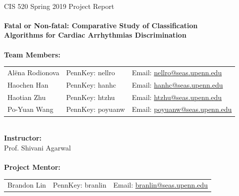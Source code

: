 \renewcommand{\headrulewidth}{0pt}
\renewcommand{\headrulewidth}{0pt}

\thispagestyle{fancy}
\mbox{}\vspace{1cm}\\
CIS 520 Spring 2019 Project Report\\
\\
{\Large \textbf{
Fatal or Non-fatal: Comparative Study of 
Classification \\Algorithms for Cardiac Arrhythmias Discrimination}} 
\\
\vspace{5cm}\\
%
%
%
\textbf{Team Members:}\\
%
\begin{tabular}{lll}%
	Al\"{e}na Rodionova & 
	PennKey: nellro &
	Email: 
	\href{mailto:nellro@seas.upenn.edu}{nellro@seas.upenn.edu} \\
	Haochen Han & 
	PennKey: hanhc& 
	Email: \href{mailto:hanhc@seas.upenn.edu}{hanhc@seas.upenn.edu}\\
	Haotian Zhu &
	PennKey: htzhu& 
	Email: \href{mailto:htzhu@seas.upenn.edu}{htzhu@seas.upenn.edu}\\
	Po-Yuan Wang & 
	PennKey: poyuanw & 
	Email:
	\href{mailto:poyuanw@seas.upenn.edu}{poyuanw@seas.upenn.edu}
\end{tabular}
\vspace{1cm}\\
\textbf{Instructor:}\\
Prof. Shivani Agarwal\\
%
\vspace{1cm}\\
\textbf{Project Mentor:}\\
\begin{tabular}{lll}%
	Brandon Lin & 
	PennKey: branlin &
	Email: 
	\href{mailto:branlin@seas.upenn.edu}{branlin@seas.upenn.edu} \\
\end{tabular}
\newpage